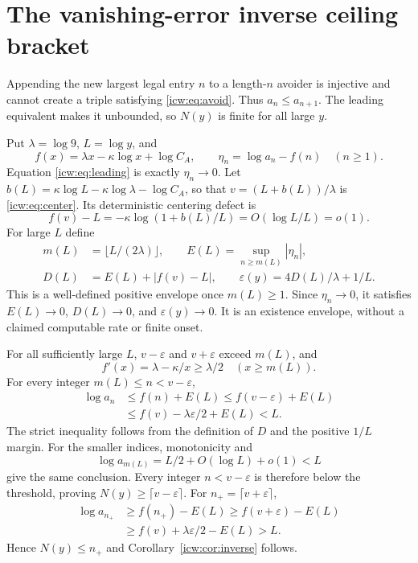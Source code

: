 \documentclass[11pt,letterpaper]{article}
\theoremstyle{remark}\newtheorem{remark}[theorem]{Remark}
\newcommand{\eps}{\varepsilon}
\newcommand{\1}{\mathbf1}
\begin{document}
\section{The vanishing-error inverse ceiling bracket}\label{icw:sec:inverse}
Appending the new largest legal entry $n$ to a length-$n$ avoider is
injective and cannot create a triple satisfying \eqref{icw:eq:avoid}.
Thus $a_n\le a_{n+1}$. The leading equivalent makes it unbounded,
so $N(y)$ is finite for all large $y$.

Put $\lambda=\log9$, $L=\log y$, and
\[
 f(x)=\lambda x-\kappa\log x+\log C_A,\qquad
 \eta_n=\log a_n-f(n)\quad(n\ge1).
\]
Equation \eqref{icw:eq:leading} is exactly $\eta_n\to0$.
Let $b(L)=\kappa\log L-\kappa\log\lambda-\log C_A$, so that
$v=(L+b(L))/\lambda$ is \eqref{icw:eq:center}. Its deterministic centering
defect is
\begin{equation}\label{icw:eq:centering-defect}
 f(v)-L=-\kappa\log(1+b(L)/L)
       =O(\log L/L)=o(1).
\end{equation}
For large $L$ define
\begin{equation}\label{icw:eq:inverse-envelope}
 \begin{split}
 m(L)&=\lfloor L/(2\lambda)\rfloor,\qquad
 E(L)=\sup_{n\ge m(L)}|\eta_n|,\\
 D(L)&=E(L)+|f(v)-L|,\qquad
 \eps(y)=4D(L)/\lambda+1/L.
 \end{split}
\end{equation}
This is a well-defined positive envelope once $m(L)\ge1$.
Since $\eta_n\to0$, it satisfies $E(L)\to0$, $D(L)\to0$, and
$\eps(y)\to0$. It is an existence envelope, without a claimed
computable rate or finite onset.

For all sufficiently large $L$, $v-\eps$ and $v+\eps$ exceed $m(L)$,
and
\[
 f'(x)=\lambda-\kappa/x\ge\lambda/2\quad(x\ge m(L)).
\]
For every integer $m(L)\le n<v-\eps$,
\begin{align*}
 \log a_n&\le f(n)+E(L)\le f(v-\eps)+E(L)\\
 &\le f(v)-\lambda\eps/2+E(L)<L.
\end{align*}
The strict inequality follows from the definition of $D$ and the positive
$1/L$ margin. For the smaller indices, monotonicity and
\[
 \log a_{m(L)}=L/2+O(\log L)+o(1)<L
\]
give the same conclusion. Every integer $n<v-\eps$ is therefore below
the threshold, proving $N(y)\ge\lceil v-\eps\rceil$.
For $n_+=\lceil v+\eps\rceil$,
\begin{align*}
 \log a_{n_+}&\ge f(n_+)-E(L)\ge f(v+\eps)-E(L)\\
 &\ge f(v)+\lambda\eps/2-E(L)>L.
\end{align*}
Hence $N(y)\le n_+$ and Corollary~\ref{icw:cor:inverse} follows.
\end{document}
